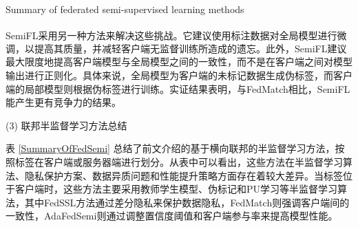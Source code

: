 \begin{table}[h]
	\centering
	{\songti \wuhao Summary of federated semi-supervised learning methods}
	\label{SummaryOfFedSemi}
\end{table}
\vspace{-0.35cm}

SemiFL\textsuperscript{\cite{diao2022semifl}}采用另一种方法来解决这些挑战。它建议使用标注数据对全局模型进行微调，以提高其质量，并减轻客户端无监督训练所造成的遗忘。此外，SemiFL建议最大限度地提高客户端模型与全局模型之间的一致性，而不是在客户端之间对模型输出进行正则化。具体来说，全局模型为客户端的未标记数据生成伪标签，而客户端的局部模型则根据伪标签进行训练。实证结果表明，与FedMatch相比，SemiFL能产生更有竞争力的结果。

(3) 联邦半监督学习方法总结

表 \ref{SummaryOfFedSemi} 总结了前文介绍的基于横向联邦的半监督学习方法，按照标签在客户端或服务器端进行划分。从表中可以看出，这些方法在半监督学习算法、隐私保护方案、数据异质问题和性能提升策略方面存在着较大差异。当标签位于客户端时，这些方法主要采用教师学生模型、伪标记和PU学习等半监督学习算法，其中FedSSL方法通过差分隐私来保护数据隐私，FedMatch则强调客户端间的一致性，AdaFedSemi则通过调整置信度阈值和客户端参与率来提高模型性能。



